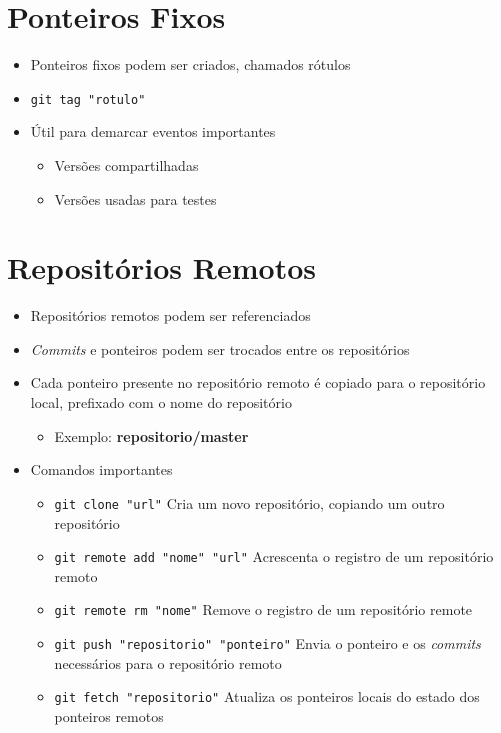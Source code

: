 \documentclass{beamer}
\newenvironment{slide}{\begin{frame}{\insertsection}}{\end{frame}}
\begin{document}
\section{Ponteiros Fixos}
\begin{slide}
    \begin{itemize}
        \item Ponteiros fixos podem ser criados, chamados rótulos
        \pause
        \item \texttt{git tag "rotulo"}
        \pause
        \item Útil para demarcar eventos importantes
        \begin{itemize}
            \pause
            \item Versões compartilhadas
            \pause
            \item Versões usadas para testes
        \end{itemize}
    \end{itemize}
\end{slide}

\section{Repositórios Remotos}
\begin{slide}
    \begin{itemize}
        \item Repositórios remotos podem ser referenciados
        \pause
        \item \emph{Commits} e ponteiros podem ser trocados entre os
            repositórios
        \pause
        \item Cada ponteiro presente no repositório remoto é copiado para o
            repositório local, prefixado com o nome do repositório
            \begin{itemize}
                \pause
                \item Exemplo: \textbf{repositorio/master}
            \end{itemize}
        \pause
        \item Comandos importantes
        \begin{itemize}
            \pause
            \item \texttt{git clone "url"} Cria um novo repositório, copiando um
                outro repositório
            \pause
            \item \texttt{git remote add "nome" "url"} Acrescenta o registro de
                um repositório remoto
            \pause
            \item \texttt{git remote rm "nome"} Remove o registro de um
                repositório remote
            \pause
            \item \texttt{git push "repositorio" "ponteiro"} Envia o ponteiro e
                os \emph{commits} necessários para o repositório remoto
            \pause
            \item \texttt{git fetch "repositorio"} Atualiza os ponteiros locais
                do estado dos ponteiros remotos
        \end{itemize}
    \end{itemize}
\end{slide}
\end{document}
